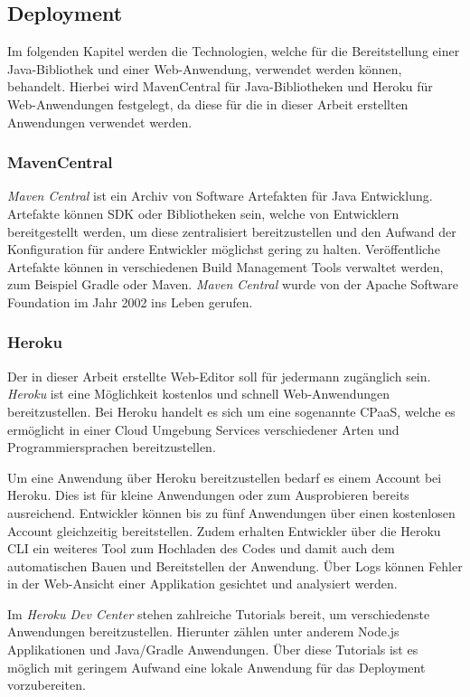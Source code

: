 \subsection{Deployment}\label{subsec:deployment}
Im folgenden Kapitel werden die Technologien, welche für die Bereitstellung einer Java-Bibliothek und einer Web-Anwendung, verwendet werden können, behandelt.
Hierbei wird MavenCentral für Java-Bibliotheken und Heroku für Web-Anwendungen festgelegt, da diese für die in dieser Arbeit erstellten
Anwendungen verwendet werden.

\subsubsection{MavenCentral}\label{subsubsec:mavencentral}
\textit{Maven Central} ist ein Archiv von Software Artefakten für Java Entwicklung.
Artefakte können \ac{SDK} oder Bibliotheken sein, welche von Entwicklern bereitgestellt werden, um diese zentralisiert bereitzustellen
und den Aufwand der Konfiguration für andere Entwickler möglichst gering zu halten.\cite*{maven}
Veröffentliche Artefakte können in verschiedenen Build Management Tools verwaltet werden, zum Beispiel Gradle oder Maven.
\textit{Maven Central} wurde von der Apache Software Foundation im Jahr 2002 ins Leben gerufen.

\subsubsection{Heroku}\label{subsubsec:heroku}
Der in dieser Arbeit erstellte Web-Editor soll für jedermann zugänglich sein.
\textit{Heroku} ist eine Möglichkeit kostenlos und schnell Web-Anwendungen bereitzustellen.
Bei Heroku handelt es sich um eine sogenannte \ac{CPaaS}, welche es ermöglicht in einer Cloud Umgebung
Services verschiedener Arten und Programmiersprachen bereitzustellen.\cite*{heroku}

Um eine Anwendung über Heroku bereitzustellen bedarf es einem Account bei Heroku.
Dies ist für kleine Anwendungen oder zum Ausprobieren bereits ausreichend.
Entwickler können bis zu fünf Anwendungen über einen kostenlosen Account gleichzeitig bereitstellen.
Zudem erhalten Entwickler über die Heroku CLI ein weiteres Tool zum Hochladen des Codes und damit auch dem automatischen
Bauen und Bereitstellen der Anwendung.
Über Logs können Fehler in der Web-Ansicht einer Applikation gesichtet und analysiert werden.

Im \textit{Heroku Dev Center} stehen zahlreiche Tutorials bereit, um verschiedenste Anwendungen bereitzustellen.
Hierunter zählen unter anderem Node.js Applikationen und Java/Gradle Anwendungen.\cite*{herokuDev}
Über diese Tutorials ist es möglich mit geringem Aufwand eine lokale Anwendung für das Deployment vorzubereiten.

